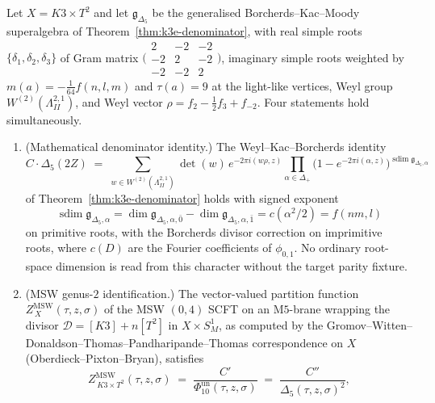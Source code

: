 \begin{theorem}
\label{thm:k3e-msw-harvey-moore}
%
%
%
Let $X = K3\times T^{2}$ and let $\mathfrak{g}_{\Delta_5}$ be the generalised Borcherds--Kac--Moody superalgebra of Theorem~\ref{thm:k3e-denominator}, with real simple roots $\{\delta_1, \delta_2, \delta_3\}$ of Gram matrix $\bigl(\begin{smallmatrix}2 & -2 & -2\\ -2 & 2 & -2\\ -2 & -2 & 2\end{smallmatrix}\bigr)$, imaginary simple roots weighted by $m(a) = -\tfrac{1}{64}f(n, l, m)$ and $\tau(a) = 9$ at the light-like vertices, Weyl group $W^{(2)}(\Lambda^{2,1}_{II})$, and Weyl vector $\rho = f_2 - \tfrac12 f_3 + f_{-2}$. Four statements hold simultaneously.
\begin{enumerate}[label=\textup{(\alph*)}]
\item \textup{(Mathematical denominator identity.)} The Weyl--Kac--Borcherds identity
\[
C\cdot\Delta_5(2Z)
\;=\; \!\!\sum_{w\in W^{(2)}(\Lambda^{2,1}_{II})}\!\!\!\!\det(w)\,e^{-2\pi i(w\rho, z)}\!\!\prod_{\alpha\in\Delta_+}\!\!\bigl(1 - e^{-2\pi i(\alpha, z)}\bigr)^{\operatorname{sdim}\mathfrak g_{\Delta_5,\alpha}}
\]
of Theorem~\ref{thm:k3e-denominator} holds with signed exponent
\[
\operatorname{sdim}\mathfrak g_{\Delta_5,\alpha}
=
\dim\mathfrak g_{\Delta_5,\alpha,\bar0}
-\dim\mathfrak g_{\Delta_5,\alpha,\bar1}
= c(\alpha^{2}/2) = f(nm, l)
\]
on primitive roots, with the Borcherds divisor correction on imprimitive roots, where $c(D)$ are the Fourier coefficients of $\phi_{0,1}$. No ordinary root-space dimension is read from this character without the target parity fixture.
\item \textup{(MSW genus-$2$ identification.)} The vector-valued partition function $Z^{\mathrm{MSW}}_{\,X}(\tau, z, \sigma)$ of the MSW $(0, 4)$ SCFT on an M$5$-brane wrapping the divisor $\mathcal{D} = [K3] + n[T^{2}]$ in $X\times S^{1}_{M}$, as computed by the Gromov--Witten--Donaldson--Thomas--Pandharipande--Thomas correspondence on $X$ (Oberdieck--Pixton--Bryan), satisfies
\[
Z^{\mathrm{MSW}}_{\,K3\times T^{2}}(\tau, z, \sigma) \;=\; \frac{C'}{\Phi_{10}^{\mathrm{un}}(\tau, z, \sigma)} \;=\; \frac{C''}{\Delta_5(\tau, z, \sigma)^{2}},
\]
\end{enumerate}
\end{theorem}
